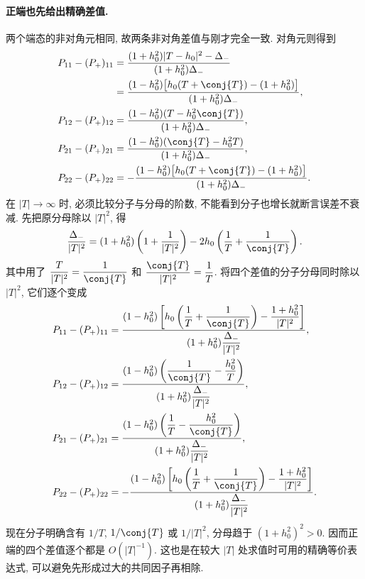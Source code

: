 \paragraph{正端也先给出精确差值.}
两个端态的非对角元相同, 故两条非对角差值与刚才完全一致. 对角元则得到
\begin{align*}
P_{11}-(P_+)_{11}
&=\dfrac{(1+h_0^2)|T-h_0|^2-\Delta_-}
{(1+h_0^2)\Delta_-}\\
&=\dfrac{(1-h_0^2)
\bigl[h_0(T+\conj{T})-(1+h_0^2)\bigr]}
{(1+h_0^2)\Delta_-},\\
P_{12}-(P_+)_{12}
&=\dfrac{(1-h_0^2)(T-h_0^2\conj{T})}
{(1+h_0^2)\Delta_-},\\
P_{21}-(P_+)_{21}
&=\dfrac{(1-h_0^2)(\conj{T}-h_0^2T)}
{(1+h_0^2)\Delta_-},\\
P_{22}-(P_+)_{22}
&=-\dfrac{(1-h_0^2)
\bigl[h_0(T+\conj{T})-(1+h_0^2)\bigr]}
{(1+h_0^2)\Delta_-}.
\end{align*}
在 $|T|\to\infty$ 时, 必须比较分子与分母的阶数, 不能看到分子也增长就断言误差不衰减. 先把原分母除以 $|T|^2$, 得
\[
\dfrac{\Delta_-}{|T|^2}
=(1+h_0^2)\left(1+\dfrac{1}{|T|^2}\right)
-2h_0\left(\dfrac{1}{T}+\dfrac{1}{\conj{T}}\right).
\]
其中用了 $\dfrac{T}{|T|^2}=\dfrac{1}{\conj{T}}$ 和 $\dfrac{\conj{T}}{|T|^2}=\dfrac{1}{T}$. 将四个差值的分子分母同时除以 $|T|^2$, 它们逐个变成
\begin{align*}
P_{11}-(P_+)_{11}
&=\dfrac{(1-h_0^2)
\left[h_0\left(\dfrac{1}{T}+\dfrac{1}{\conj{T}}\right)
-\dfrac{1+h_0^2}{|T|^2}\right]}
{(1+h_0^2)\dfrac{\Delta_-}{|T|^2}},\\
P_{12}-(P_+)_{12}
&=\dfrac{(1-h_0^2)
\left(\dfrac{1}{\conj{T}}-\dfrac{h_0^2}{T}\right)}
{(1+h_0^2)\dfrac{\Delta_-}{|T|^2}},\\
P_{21}-(P_+)_{21}
&=\dfrac{(1-h_0^2)
\left(\dfrac{1}{T}-\dfrac{h_0^2}{\conj{T}}\right)}
{(1+h_0^2)\dfrac{\Delta_-}{|T|^2}},\\
P_{22}-(P_+)_{22}
&=-\dfrac{(1-h_0^2)
\left[h_0\left(\dfrac{1}{T}+\dfrac{1}{\conj{T}}\right)
-\dfrac{1+h_0^2}{|T|^2}\right]}
{(1+h_0^2)\dfrac{\Delta_-}{|T|^2}}.
\end{align*}
现在分子明确含有 $1/T$, $1/\conj{T}$ 或 $1/|T|^2$, 分母趋于 $(1+h_0^2)^2>0$. 因而正端的四个差值逐个都是 $O(|T|^{-1})$. 这也是在较大 $|T|$ 处求值时可用的精确等价表达式, 可以避免先形成过大的共同因子再相除.

